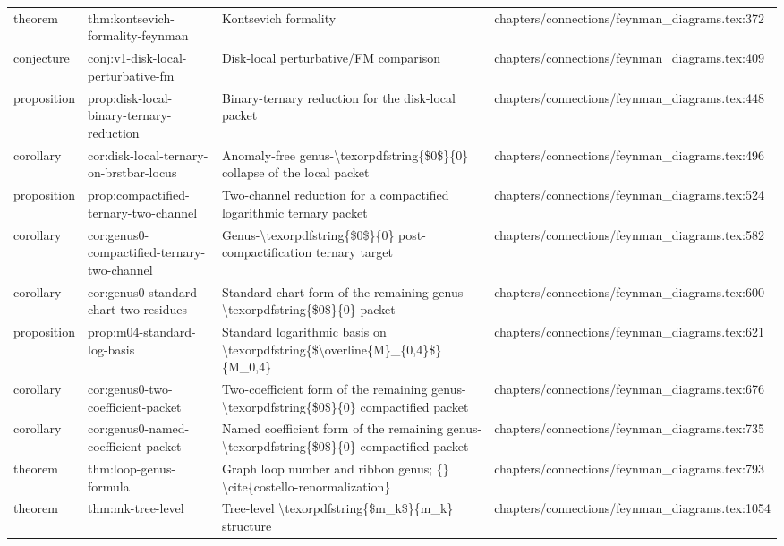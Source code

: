 \documentclass[11pt]{article}
\begin{document}
\begin{longtable}{L{0.10\textwidth}L{0.26\textwidth}L{0.42\textwidth}L{0.22\textwidth}}
theorem & thm:kontsevich-formality-feynman & Kontsevich formality & chapters/connections/feynman\_diagrams.tex:372\\
conjecture & conj:v1-disk-local-perturbative-fm & Disk-local perturbative/FM comparison & chapters/connections/feynman\_diagrams.tex:409\\
proposition & prop:disk-local-binary-ternary-reduction & Binary-ternary reduction for the disk-local packet & chapters/connections/feynman\_diagrams.tex:448\\
corollary & cor:disk-local-ternary-on-brstbar-locus & Anomaly-free genus-\textbackslash{}texorpdfstring\{\$0\$\}\{0\} collapse of the local packet & chapters/connections/feynman\_diagrams.tex:496\\
proposition & prop:compactified-ternary-two-channel & Two-channel reduction for a compactified logarithmic ternary packet & chapters/connections/feynman\_diagrams.tex:524\\
corollary & cor:genus0-compactified-ternary-two-channel & Genus-\textbackslash{}texorpdfstring\{\$0\$\}\{0\} post-compactification ternary target & chapters/connections/feynman\_diagrams.tex:582\\
corollary & cor:genus0-standard-chart-two-residues & Standard-chart form of the remaining genus-\textbackslash{}texorpdfstring\{\$0\$\}\{0\} packet & chapters/connections/feynman\_diagrams.tex:600\\
proposition & prop:m04-standard-log-basis & Standard logarithmic basis on \textbackslash{}texorpdfstring\{\$\textbackslash{}overline\{M\}\_\{0,4\}\$\}\{M\_0,4\} & chapters/connections/feynman\_diagrams.tex:621\\
corollary & cor:genus0-two-coefficient-packet & Two-coefficient form of the remaining genus-\textbackslash{}texorpdfstring\{\$0\$\}\{0\} compactified packet & chapters/connections/feynman\_diagrams.tex:676\\
corollary & cor:genus0-named-coefficient-packet & Named coefficient form of the remaining genus-\textbackslash{}texorpdfstring\{\$0\$\}\{0\} compactified packet & chapters/connections/feynman\_diagrams.tex:735\\
theorem & thm:loop-genus-formula & Graph loop number and ribbon genus; \{\} \textbackslash{}cite\{costello-renormalization\} & chapters/connections/feynman\_diagrams.tex:793\\
theorem & thm:mk-tree-level & Tree-level \textbackslash{}texorpdfstring\{\$m\_k\$\}\{m\_k\} structure & chapters/connections/feynman\_diagrams.tex:1054\\

\end{longtable}
\end{document}
